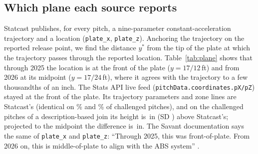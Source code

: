 \documentclass[aoas]{imsart}
\theoremstyle{plain}
\theoremstyle{definition}
\begin{document}
\subsection{Which plane each source reports}\label{sec:plane}
Statcast publishes, for every pitch, a nine-parameter constant-acceleration trajectory and a location
(\texttt{plate\_x}, \texttt{plate\_z}). Anchoring the trajectory on the reported release point, we find the distance
$y^*$ from the tip of the plate at which the trajectory passes through the reported location. Table~\ref{tab:plane}
shows that through 2025 the location is at the front of the plate ($y=17/12$\,ft) and from 2026 at its midpoint
($y=17/24$\,ft), where it agrees with the trajectory to a few thousandths of an inch. The Stats API live feed
(\texttt{pitchData.coordinates.pX/pZ}) stayed at the front of the plate. Its trajectory parameters and zone lines are
Statcast's (identical on \SFeedTrajIdentical\% and \SFeedSzIdentical\% of challenged pitches), and on the \GeomNOld{}
challenged pitches of a description-based join its height is \SFeedDz\,in (SD \SFeedDzSD) above Statcast's; projected to the midpoint the
difference is \SFeedDzMid\,in. The Savant documentation says the same of \texttt{plate\_x} and \texttt{plate\_z}:
``Through 2025, this was front-of-plate. From 2026 on, this is middle-of-plate to align with the ABS system''
\citep{SavantCSV2026}.

\begin{table}[!htbp]
\caption{Plane of the reported pitch location. $\Delta z$: mean (SD) of trajectory height minus reported
\texttt{plate\_z}, in inches, with the trajectory evaluated at the front of the plate or at its midpoint; $y^*$: where
the trajectory meets the reported location.}\label{tab:plane}
\centering\small
\resizebox{\textwidth}{!}{}
\end{table}
\end{document}

